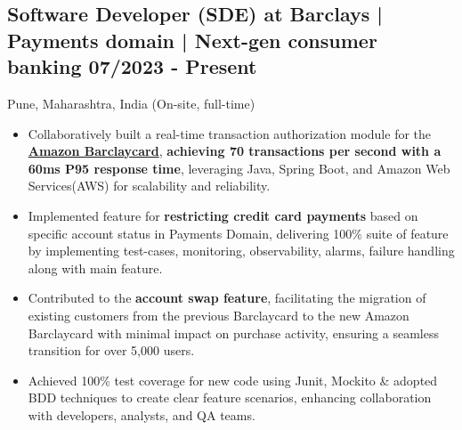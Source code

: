 \documentclass[a4,10pt]{article}
\newcommand{\subtext}[1]{
#1\par\vspace{-0.2cm}}
\newenvironment{zitemize}{
\begin{itemize}\itemsep0pt \parskip0pt \parsep1pt}
{\end{itemize}\vspace{-0.5cm}}
\begin{document}

\subsection*{Software Developer (SDE) at Barclays | Payments domain | Next-gen consumer banking \hfill 07/2023 - Present} 
\subtext{Pune, Maharashtra, India {\normalsize\normalfont (On-site, full-time) }} 
    \begin{zitemize}
        \item Collaboratively built a real-time transaction authorization module for the \href{https://www.amazon.co.uk/dp/B0BH98211K}{\textbf{Amazon Barclaycard}}, \textbf{achieving 70 transactions per second with a 60ms P95 response time}, leveraging Java, Spring Boot, and Amazon Web Services(AWS) for scalability and reliability.
        \item Implemented feature for \textbf{restricting credit card payments} based on specific account status in Payments Domain, delivering 100\% suite of feature by implementing test-cases, monitoring, observability, alarms, failure handling along with main feature.
        \item Contributed to the \textbf{account swap feature}, facilitating the migration of existing customers from the previous Barclaycard to the new Amazon Barclaycard with minimal impact on purchase activity, ensuring a seamless transition for over 5,000 users.
        \item Achieved 100\% test coverage for new code using Junit, Mockito \& adopted BDD techniques to create clear feature scenarios, enhancing collaboration with developers, analysts, and QA teams.
    \end{zitemize}
\end{document}
